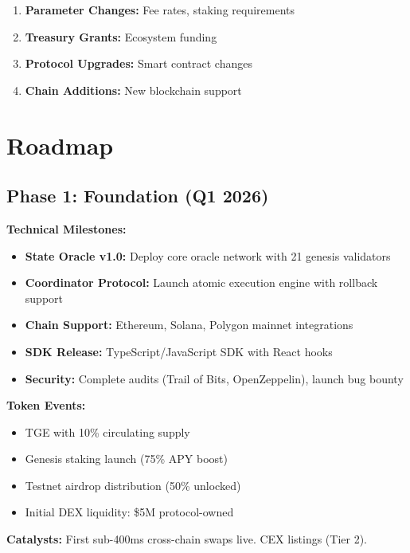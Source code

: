 \documentclass[12pt,a4paper]{article}
\begin{document}
\begin{enumerate}
    \item \textbf{Parameter Changes:} Fee rates, staking requirements
    \item \textbf{Treasury Grants:} Ecosystem funding
    \item \textbf{Protocol Upgrades:} Smart contract changes
    \item \textbf{Chain Additions:} New blockchain support
\end{enumerate}

\section{Roadmap}

\subsection{Phase 1: Foundation (Q1 2026)}

\textbf{Technical Milestones:}
\begin{itemize}
    \item \textbf{State Oracle v1.0:} Deploy core oracle network with 21 genesis validators
    \item \textbf{Coordinator Protocol:} Launch atomic execution engine with rollback support
    \item \textbf{Chain Support:} Ethereum, Solana, Polygon mainnet integrations
    \item \textbf{SDK Release:} TypeScript/JavaScript SDK with React hooks
    \item \textbf{Security:} Complete audits (Trail of Bits, OpenZeppelin), launch bug bounty
\end{itemize}

\textbf{Token Events:}
\begin{itemize}
    \item TGE with 10\% circulating supply
    \item Genesis staking launch (75\% APY boost)
    \item Testnet airdrop distribution (50\% unlocked)
    \item Initial DEX liquidity: \$5M protocol-owned
\end{itemize}

\textbf{Catalysts:} First sub-400ms cross-chain swaps live. CEX listings (Tier 2).
\end{document}
